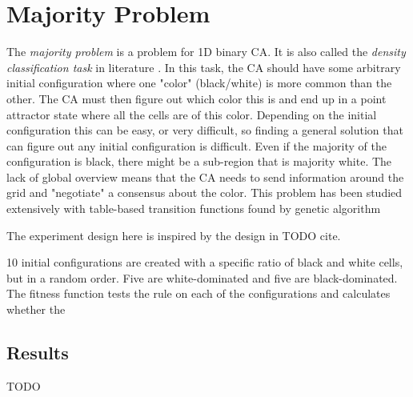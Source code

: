 \section{Majority Problem}
The \textit{majority problem} is a problem for 1D binary CA.
It is also called the \textit{density classification task} in literature \cite{mitchell1993revisiting, mitchell1996evolving}.
In this task, the CA should have some arbitrary initial configuration where one "color" (black/white) is more common than the other.
The CA must then figure out which color this is and end up in a point attractor state where all the cells are of this color.
Depending on the initial configuration this can be easy, or very difficult, so finding a general solution that can figure out any initial configuration is difficult.
Even if the majority of the configuration is black, there might be a sub-region that is majority white.
The lack of global overview means that the CA needs to send information around the grid and "negotiate" a consensus about the color.
This problem has been studied extensively with table-based transition functions found by genetic algorithm \cite{mitchell1993revisiting, mitchell1996evolving, mitchell-2001} 

The experiment design here is inspired by the design in TODO cite.

10 initial configurations are created with a specific ratio of black and white cells, but in a random order.
Five are white-dominated and five are black-dominated.
The fitness function tests the rule on each of the configurations and calculates whether the 

\subsection{Results}
TODO

